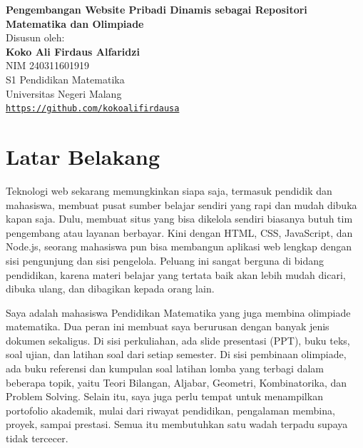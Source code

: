 \documentclass[12pt,a4paper]{article}
\begin{document}
	
	\begin{center}
		{\LARGE\textbf{Pengembangan Website Pribadi Dinamis sebagai Repositori Matematika dan Olimpiade}}\\[8pt]
		
		\vspace{20pt}
		{\small Disusun oleh:}\\[6pt]
		{\Large\textbf{Koko Ali Firdaus Alfaridzi}}\\[2pt]
		NIM 240311601919\\[10pt]
		S1 Pendidikan Matematika\\
		Universitas Negeri Malang\\[6pt]
		{\small\texttt{\url{https://github.com/kokoalifirdausa}}}
	\end{center}
	
	\vspace{6pt}
	
	\newpage
	\renewcommand{\contentsname}{Daftar Isi}
	\begingroup
	\hypersetup{linkcolor=black}%
	\tableofcontents
	\endgroup
	\newpage
	
	\section{Latar Belakang}
	
	Teknologi web sekarang memungkinkan siapa saja, termasuk pendidik dan mahasiswa, membuat pusat sumber belajar sendiri yang rapi dan mudah dibuka kapan saja. Dulu, membuat situs yang bisa dikelola sendiri biasanya butuh tim pengembang atau layanan berbayar. Kini dengan HTML, CSS, JavaScript, dan Node.js, seorang mahasiswa pun bisa membangun aplikasi web lengkap dengan sisi pengunjung dan sisi pengelola. Peluang ini sangat berguna di bidang pendidikan, karena materi belajar yang tertata baik akan lebih mudah dicari, dibuka ulang, dan dibagikan kepada orang lain.

	Saya adalah mahasiswa Pendidikan Matematika yang juga membina olimpiade matematika. Dua peran ini membuat saya berurusan dengan banyak jenis dokumen sekaligus. Di sisi perkuliahan, ada slide presentasi (PPT), buku teks, soal ujian, dan latihan soal dari setiap semester. Di sisi pembinaan olimpiade, ada buku referensi dan kumpulan soal latihan lomba yang terbagi dalam beberapa topik, yaitu Teori Bilangan, Aljabar, Geometri, Kombinatorika, dan Problem Solving. Selain itu, saya juga perlu tempat untuk menampilkan portofolio akademik, mulai dari riwayat pendidikan, pengalaman membina, proyek, sampai prestasi. Semua itu membutuhkan satu wadah terpadu supaya tidak tercecer.
\end{document}
